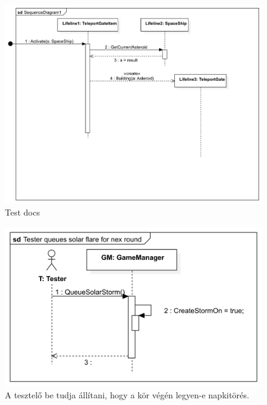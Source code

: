 \begin{figure}[H] 
\centering 
\includegraphics[width=1\textwidth]{docs/img/svg/Skeleton!Place gate!Interaction1!SequenceDiagram1_34.png} 
\caption{Test docs
} 
\end{figure} 

\begin{figure}[H] 
\centering 
\includegraphics[width=1\textwidth]{docs/img/svg/Skeleton!Solar flare!Interaction1!Tester queues solar flare for nex round_34.png} 
\caption{A tesztelő be tudja állítani, hogy a kör végén legyen-e napkitörés.} 
\end{figure} 


